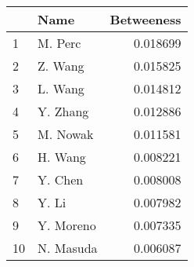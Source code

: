 \begin{tabular}{llr}
\toprule
{} &       Name &  Betweeness \\
\midrule
1  &    M. Perc &    0.018699 \\
2  &    Z. Wang &    0.015825 \\
3  &    L. Wang &    0.014812 \\
4  &   Y. Zhang &    0.012886 \\
5  &   M. Nowak &    0.011581 \\
6  &    H. Wang &    0.008221 \\
7  &    Y. Chen &    0.008008 \\
8  &      Y. Li &    0.007982 \\
9  &  Y. Moreno &    0.007335 \\
10 &  N. Masuda &    0.006087 \\
\bottomrule
\end{tabular}
